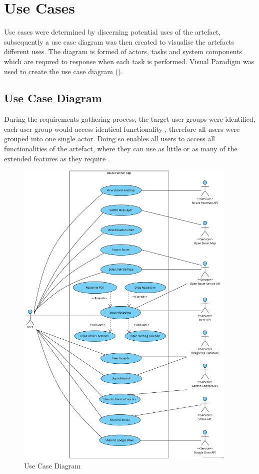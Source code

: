   \clearpage
\section{Use Cases}
\label{design:usecase}
Use cases were determined by discerning potential uses of the artefact, subsequently a use case diagram was then created to visualise the artefacts different uses. The diagram is formed of actors, tasks and system components which are requred to response when each task is performed. Visual Paradigm was used to create the use case diagram (\cite{noauthor_ideal_nodate}).

\subsection{Use Case Diagram}
\label{usecase:diagram}
During the requirements gathering process, the target user groups were identified, each user group would access identical functionality , therefore all users were grouped into one single actor. Doing so enables all users to access all functionalities of the artefact, where they can use as little or as many of the extended features as they require .

\begin{figure}[!ht]
  \centering
  \includegraphics[width=400px]{figures/use-case.png}
  \caption{Use Case Diagram}
  \label{fig:usecase}
\end{figure}

